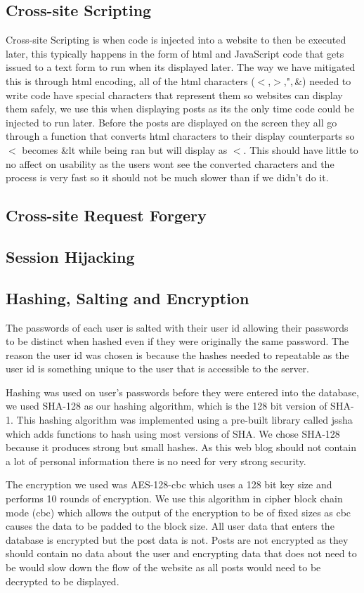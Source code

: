 \documentclass{cmpstyle}
\begin{document}
\subsection{Cross-site Scripting}
Cross-site Scripting is when code is injected into a website to then be executed later, this typically happens in the form of html and JavaScript code that gets issued to a text form to run when its displayed later. The way we have mitigated this is through html encoding, all of the html characters ($<$,$>$,",\,\&) needed to write code have special characters that represent them so websites can display them safely, we use this when displaying posts as its the only time code could be injected to run later. Before the posts are displayed on the screen they all go through a function that converts html characters to their display counterparts so $<$ becomes \&lt while being ran but will display as $<$. This should have little to no affect on usability as the users wont see the converted characters and the process is very fast so it should not be much slower than if we didn't do it.
\subsection{Cross-site Request Forgery}
\subsection{Session Hijacking}
\subsection{Hashing, Salting and Encryption}
The passwords of each user is salted with their user id allowing their passwords to be distinct when hashed even if they were originally the same password. The reason the user id was chosen is because the hashes needed to repeatable as the user id is something unique to the user that is accessible to the server.

Hashing was used on user's passwords before they were entered into the database, we used SHA-128 as our hashing algorithm, which is the 128 bit version of SHA-1. This hashing algorithm was implemented using a pre-built library called jssha which adds functions to hash using most versions of SHA. We chose SHA-128 because it produces strong but small hashes. As this web blog should not contain a lot of personal information there is no need for very strong security.

The encryption we used was AES-128-cbc which uses a 128 bit key size and performs 10 rounds of encryption. We use this algorithm in cipher block chain mode (cbc) which allows the output of the encryption to be of fixed sizes as cbc causes the data to be padded to the block size. All user data that enters the database is encrypted but the post data is not. Posts are not encrypted as they should contain no data about the user and encrypting data that does not need to be would slow down the flow of the website as all posts would need to be decrypted to be displayed.
\end{document}
